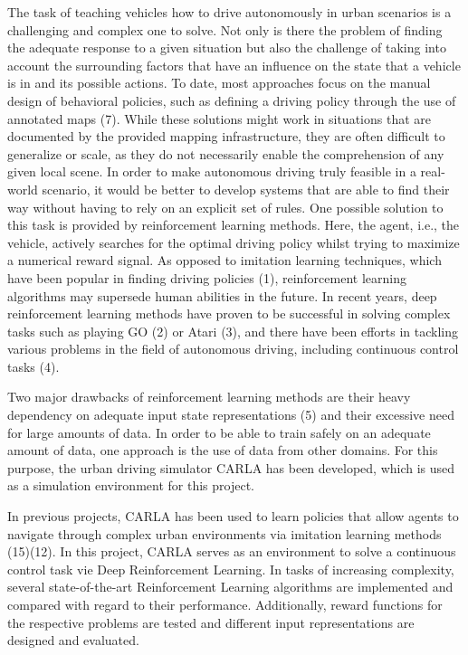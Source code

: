 \documentclass[letterpaper, 10 pt, conference]{ieeeconf}  %
\begin{document}

The task of teaching vehicles how to drive autonomously in urban scenarios is a challenging and complex one to solve. Not only is there the problem of finding the adequate response to a given situation but also the challenge of taking into account the surrounding factors that have an influence on the state that a vehicle is in and its possible actions. To date, most approaches focus on the manual design of behavioral policies, such as defining a driving policy through the use of annotated maps (7). While these solutions might work in situations that are documented by the provided mapping infrastructure, they are often difficult to generalize or scale, as they do not necessarily enable the comprehension of any given local scene. In order to make autonomous driving truly feasible in a real-world scenario, it would be better to develop systems that are able to find their way without having to rely on an explicit set of rules. One possible solution to this task is provided by reinforcement learning methods. Here, the agent, i.e., the vehicle, actively searches for the optimal driving policy whilst trying to maximize a numerical reward signal. As opposed to imitation learning techniques, which have been popular in finding driving policies (1), reinforcement learning algorithms may supersede human abilities in the future. In recent years, deep reinforcement learning methods have proven to be successful in solving complex tasks such as playing GO (2) or Atari (3), and there have been efforts in tackling various problems in the field of autonomous driving, including continuous control tasks (4).

Two major drawbacks of reinforcement learning methods are their heavy dependency on adequate input state representations (5) and their excessive need for large amounts of data. In order to be able to train safely on an adequate amount of data, one approach is the use of data from other domains. For this purpose, the urban driving simulator CARLA has been developed, which is used as a simulation environment for this project.

In previous projects, CARLA has been used to learn policies that allow agents to navigate through complex urban environments via imitation learning methods (15)(12). In this project, CARLA serves as an environment to solve a continuous control task vie Deep Reinforcement Learning. In tasks of increasing complexity, several state-of-the-art Reinforcement Learning algorithms are implemented and compared with regard to their performance. Additionally, reward functions for the respective problems are tested and different input representations are designed and evaluated.
\end{document}
